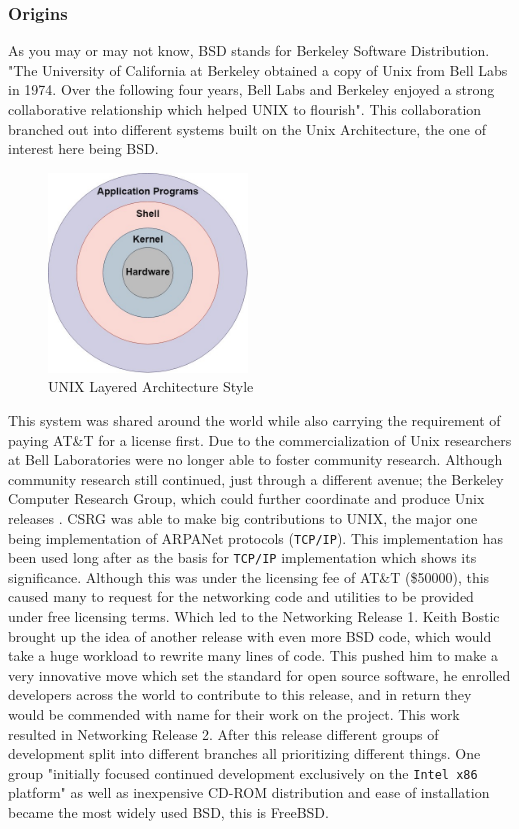 \documentclass[12pt, dvipsnames, a4paper]{article}
\newcommand{\code}[1]{\texttt{#1}}
\begin{document}
\subsubsection{Origins}
As you may or may not know, BSD stands for Berkeley Software Distribution. "The University of California at Berkeley obtained a copy of Unix from Bell Labs in 1974. Over the following four years, Bell Labs and Berkeley enjoyed a strong collaborative relationship which helped UNIX to flourish"\cite{david}. This collaboration branched out into different systems built on the Unix Architecture, the one of interest here being BSD.
\begin{figure}[h]
	\center
	\includegraphics[width=150pt]{assets/other_diagrams/Unix_Architecture.jpg}
	\caption{UNIX Layered Architecture Style}
\end{figure}
This system was shared around the world while also carrying the requirement of paying AT\&T for a license first. Due to the commercialization of Unix researchers at Bell Laboratories were no longer able to foster community research. Although community research still continued, just through a different avenue; the Berkeley Computer Research Group, which could further coordinate and produce Unix releases \cite{david}.
CSRG was able to make big contributions to UNIX, the major one being implementation of ARPANet protocols (\code{TCP/IP}). This implementation has been used long after as the basis for \code{TCP/IP} implementation which shows its significance.
Although this was under the licensing fee of AT\&T (\$50000), this caused many to request for the networking code and utilities to be provided under free licensing terms. Which led to the Networking Release 1. Keith Bostic brought up the idea of another release with even more BSD code, which would take a huge workload to rewrite many lines of code. This pushed him to make a very innovative move which set the standard for open source software, he enrolled developers across the world to contribute to this release, and in return they would be commended with name for their work on the project. This work resulted in Networking Release 2.
After this release different groups of development split into different branches all prioritizing different things. One group "initially focused continued development exclusively on the \code{Intel x86} platform" \cite{david} as well as inexpensive CD-ROM distribution and ease of installation became the most widely used BSD, this is FreeBSD.
\end{document}
